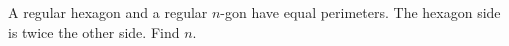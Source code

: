 A regular hexagon and a regular $n$-gon have equal perimeters. The hexagon side is twice the other side. Find $n$.
